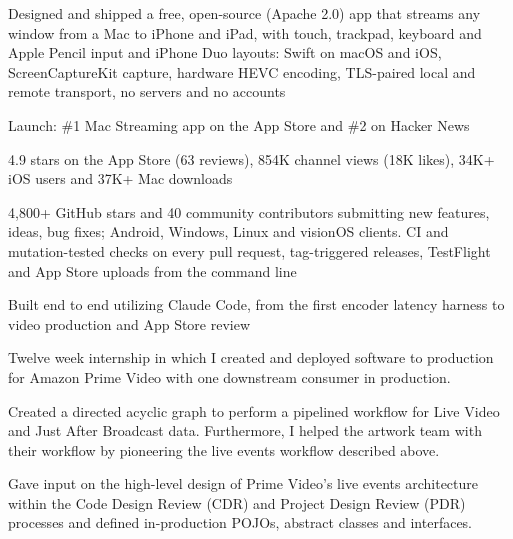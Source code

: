 \documentclass[letterpaper]{deedy-resume} %
\begin{document}
\begin{minipage}[t]{0.66\textwidth}
\begin{tightitemize}
\item Designed and shipped a free, open-source (Apache 2.0) app that streams any window from a Mac to iPhone and iPad, with touch, trackpad, keyboard and Apple Pencil input and iPhone Duo layouts: Swift on macOS and iOS, ScreenCaptureKit capture, hardware HEVC encoding, TLS-paired local and remote transport, no servers and no accounts
\item Launch: \#1 Mac Streaming app on the App Store and \#2 on Hacker News
\item 4.9 stars on the App Store (63 reviews), 854K channel views (18K likes), 34K+ iOS users and 37K+ Mac downloads
\item 4,800+ GitHub stars and 40 community contributors submitting new features, ideas, bug fixes; Android, Windows, Linux and visionOS clients. CI and mutation-tested checks on every pull request, tag-triggered releases, TestFlight and App Store uploads from the command line
\item Built end to end utilizing Claude Code, from the first encoder latency harness to video production and App Store review
\end{tightitemize}
\vspace{\topsep}


\begin{tightitemize}
\item Twelve week internship in which I created and deployed software to production for Amazon Prime Video with one downstream consumer in production.
\item Created a directed acyclic graph to perform a pipelined workflow for Live Video and Just After Broadcast data. Furthermore, I helped the artwork team with their workflow by pioneering the live events workflow described above.
\item Gave input on the high-level design of Prime Video's live events architecture within the Code Design Review (CDR) and Project Design Review (PDR) processes and defined in-production POJOs, abstract classes and interfaces.
\end{tightitemize}

\end{minipage} %
\end{document}
